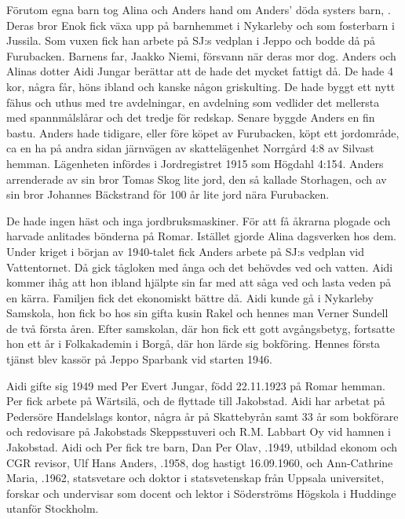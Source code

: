 Förutom egna barn tog Alina och Anders hand om Anders' döda systers barn, . Deras bror Enok fick växa upp på barnhemmet i Nykarleby och som fosterbarn i Jussila. Som vuxen fick han arbete på SJ:s vedplan i Jeppo och bodde då på Furubacken. Barnens far, Jaakko Niemi, försvann när deras mor dog. Anders och Alinas dotter Aidi Jungar berättar att de hade det mycket fattigt då. De hade 4 kor, några får, höns ibland och kanske någon griskulting. De hade byggt ett nytt fähus och uthus med tre avdelningar, en avdelning som 	vedlider det mellersta med spannmålslårar och det tredje för redskap. Senare byggde Anders en fin bastu. Anders hade tidigare, eller före köpet	av Furubacken, köpt ett jordområde, ca en ha på andra sidan järnvägen av skattelägenhet Norrgård 4:8 av Silvast hemman. Lägenheten infördes i Jordregistret 1915 som Högdahl 4:154. Anders arrenderade av sin bror Tomas Skog lite jord, den så kallade Storhagen, och av sin bror Johannes Bäckstrand för 100 år lite jord nära Furubacken.

De hade ingen häst och inga jordbruksmaskiner. För att få åkrarna plogade och harvade anlitades bönderna på Romar. Istället gjorde Alina dagsverken hos dem. Under kriget i början av 1940-talet fick Anders arbete på SJ:s vedplan vid Vattentornet. Då gick tågloken med 	ånga och det behövdes ved och vatten. Aidi kommer ihåg att hon ibland hjälpte sin far med att såga ved och lasta veden på en kärra. Familjen fick det ekonomiskt bättre då. Aidi 	kunde gå i Nykarleby Samskola, hon fick bo hos sin gifta kusin Rakel och hennes man Verner Sundell de två första åren. Efter samskolan, där hon fick ett gott avgångsbetyg, fortsatte hon ett år i Folkakademin i Borgå, där hon lärde sig bokföring. Hennes första tjänst blev kassör på Jeppo Sparbank vid starten 1946.

Aidi gifte sig 1949 med Per Evert Jungar, född 22.11.1923 på Romar hemman. Per fick arbete på Wärtsilä, och de flyttade till Jakobstad. Aidi har arbetat på Pedersöre Handelslags kontor, några år på Skattebyrån samt 33 år som bokförare och redovisare på Jakobstads Skeppsstuveri och R.M. Labbart Oy vid hamnen i Jakobstad. Aidi och Per fick tre barn, Dan Per Olav, .1949, utbildad 	ekonom och CGR revisor, Ulf Hans Anders, .1958, dog hastigt 16.09.1960, och Ann-Cathrine Maria, .1962, statsvetare och doktor i statsvetenskap från Uppsala universitet, forskar och undervisar som docent och lektor i Söderströms Högskola i Huddinge utanför Stockholm.

